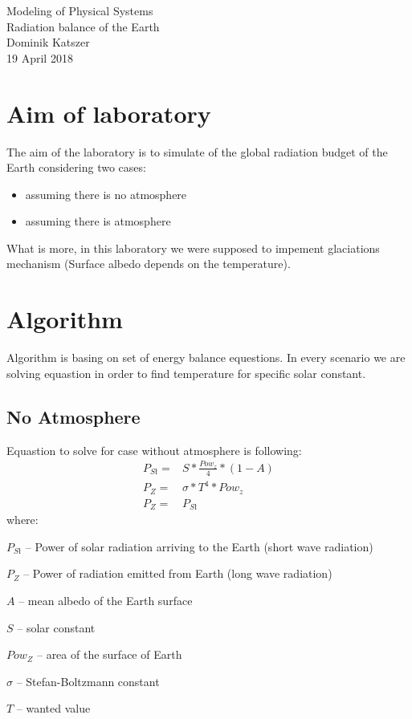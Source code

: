 \documentclass[a4paper,12pt]{article}
\begin{document}
\begin{titlepage}
\center
\vspace*{\fill}
\Huge{Modeling of Physical Systems}\\
\Large{Radiation balance of the Earth}\\
\vspace*{1.5cm}
Dominik Katszer\\
\large{19 April 2018}
\vspace*{1.5cm}
\vspace*{\fill}
\end{titlepage}
\section{Aim of laboratory}
The aim of the laboratory is to simulate of the global radiation budget of the Earth considering two cases:
\begin{itemize}
\item assuming there is no atmosphere
\item assuming there is atmosphere
\end{itemize}
What is more, in this laboratory we were supposed to impement glaciations mechanism (Surface albedo depends on the temperature).
\section{Algorithm}
Algorithm is basing on set of energy balance equestions. In every scenario we are solving equastion in order to find temperature for specific solar constant.
\subsection{No Atmosphere}
Equastion to solve for case without atmosphere is following:
\begin{align*}
P_{Sł} =& S * \frac{Pow_z}{4} * ( 1 - A) \\
P_Z =& \sigma * T^4 * Pow_z \\
P_Z =& P_{Sł}
\end{align*}
where:
\begin{description}
\item $P_{Sł}$ -- Power of solar radiation arriving to the Earth (short wave radiation)
\item $P_{Z}$ -- Power of radiation emitted from Earth (long wave radiation)
\item $A$ -- mean albedo of the Earth surface 
\item $S$ -- solar constant
\item $Pow_{Z}$ -- area of the surface of Earth
\item $\sigma$ -- Stefan-Boltzmann constant
\item $T$ -- wanted value
\end{description}
\end{document}
